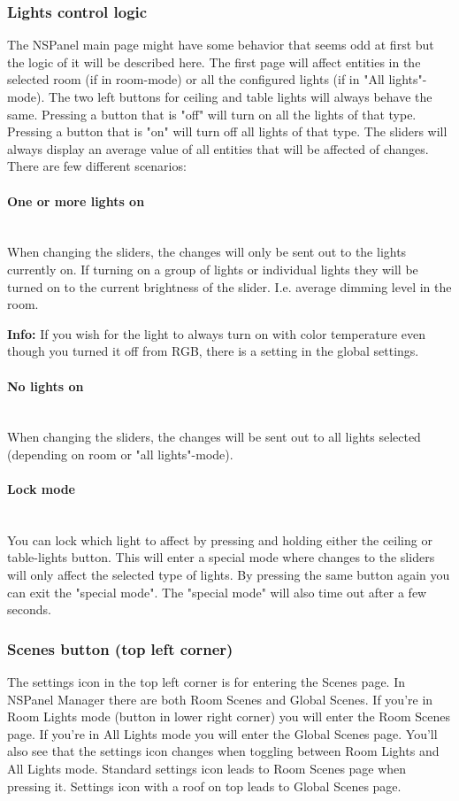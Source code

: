 \documentclass[10pt]{article}
\newcommand{\info}[1]{\begin{infoBox} \textbf{Info:} #1 \end{infoBox}}
\begin{document}
   	\subsubsection{Lights control logic}
    The NSPanel main page might have some behavior that seems odd at first but the logic of it will be described here. The first page will affect entities in the selected room (if in room-mode) or all the configured lights (if in "All lights"-mode). The two left buttons for ceiling and table lights will always behave the same. Pressing a button that is "off" will turn on all the lights of that type. Pressing a button that is "on" will turn off all lights of that type. The sliders will always display an average value of all entities that will be affected of changes. There are few different scenarios:				

    \paragraph{One or more lights on}\mbox{} \\
    When changing the sliders, the changes will only be sent out to the lights currently on.
    If turning on a group of lights or individual lights they will be turned on to the current brightness of the slider. I.e. average dimming level in the room.
    \info{If you wish for the light to always turn on with color temperature even though you turned it off from RGB, there is a setting in the global settings.}
    
    \paragraph{No lights on}\mbox{} \\
    When changing the sliders, the changes will be sent out to all lights selected (depending on room or "all lights"-mode).
    
    \paragraph{Lock mode}\mbox{} \\
    You can lock which light to affect by pressing and holding either the ceiling or table-lights button. This will enter a special mode where changes to the sliders will only affect the selected type of lights. By pressing the same button again you can exit the "special mode". The "special mode" will also time out after a few seconds.
    
    \subsubsection{Scenes button (top left corner)}
    The settings icon in the top left corner is for entering the Scenes page. In NSPanel Manager there are both Room Scenes and Global Scenes. If you're in Room Lights mode (button in lower right corner) you will enter the Room Scenes page. If you're in All Lights mode you will enter the Global Scenes page. You'll also see that the settings icon changes when toggling between Room Lights and All Lights mode. Standard settings icon leads to Room Scenes page when pressing it. Settings icon with a roof on top leads to Global Scenes page.
\end{document}
